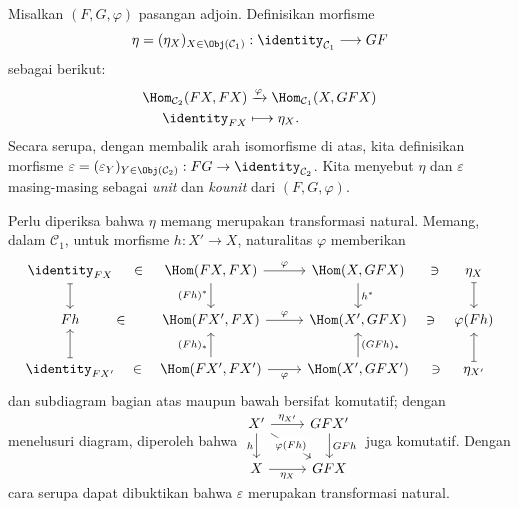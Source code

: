 \begin{definition}\label{def:adjunction-unit-counit}
	Misalkan $(F, G, \varphi)$ pasangan adjoin. Definisikan morfisme
	\[ \eta = (\eta_X)_{X \in \Obj(\mathcal{C}_1)} : \identity_{\mathcal{C}_1} \longrightarrow GF \]
	sebagai berikut:
	\begin{align*}
		\Hom_{\mathcal{C}_2}(FX, FX) & \xrightarrow{\varphi} \Hom_{\mathcal{C}_1}(X, GFX) \\
		\identity_{FX} & \longmapsto \eta_X.
	\end{align*}
	Secara serupa, dengan membalik arah isomorfisme di atas, kita definisikan morfisme $\varepsilon = (\varepsilon_Y)_{Y \in \Obj(\mathcal{C}_2)}: FG \to \identity_{\mathcal{C}_2}$. Kita menyebut $\eta$ dan $\varepsilon$ masing-masing sebagai \emph{unit} dan \emph{kounit} dari $(F, G, \varphi)$.
\end{definition}

Perlu diperiksa bahwa $\eta$ memang merupakan transformasi natural. Memang, dalam $\mathcal{C}_1$, untuk morfisme $h: X' \to X$, naturalitas $\varphi$ memberikan
\[ \begin{tikzcd}
	\identity_{FX} \arrow[phantom, r, description, "\in"] \arrow[mapsto, d] & \Hom(FX, FX) \arrow[r, "\varphi"] \arrow[d, "(Fh)^*"'] & \Hom(X, GFX) \arrow[d, "h^*"] & \arrow[phantom, l, description, "\ni"] \eta_X \arrow[mapsto, d] \\
	Fh \arrow[phantom, r, description, "\in"] & \Hom(FX', FX) \arrow[r, "\varphi"] & \Hom(X', GFX) & \arrow[phantom, l, description, "\ni"] \varphi(Fh) \\
	\identity_{FX'} \arrow[phantom, r, description, "\in"] \arrow[mapsto, u] & \Hom(FX', FX') \arrow[u, "(Fh)_*"] \arrow[r, "\varphi"'] & \Hom(X', GFX') \arrow[u, "(GFh)_*"'] & \arrow[phantom, l, description, "\ni"] \eta_{X'} \arrow[mapsto, u]
\end{tikzcd} \]
dan subdiagram bagian atas maupun bawah bersifat komutatif; dengan menelusuri diagram, diperoleh bahwa
$\begin{tikzcd}
	X' \arrow[r, "\eta_{X'}"] \arrow[d, "h"'] \arrow[rd, "\varphi(Fh)" description] & GFX' \arrow[d, "GFh"] \\
	X \arrow[r, "\eta_X"'] & GFX
\end{tikzcd}$
juga komutatif. Dengan cara serupa dapat dibuktikan bahwa $\varepsilon$ merupakan transformasi natural.

